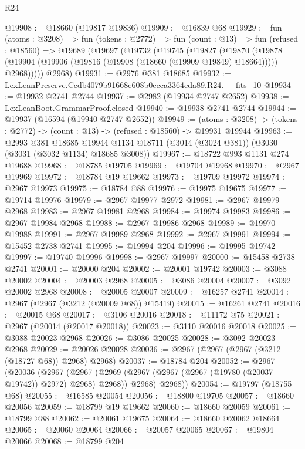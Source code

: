 \begin{lexlean}{R24}
\begin{coremodule}
@19908 := @18660 (@19817 @19836)
@19909 := @16839 @68
@19929 := fun (atoms : @3208) =>
  fun (tokens : @2772) =>
  fun (count : @13) =>
  fun (refused : @18560) =>
  @19689
    (@19697
      (@19732
        (@19745
          (@19827
            (@19870
              (@19878 (@19904 (@19906 (@19816 (@19908 (@18660 (@19909 @19849) @18664))))) @2968)))))
      @2968)
@19931 := @2976 @381 @18685
@19932 := LexLeanPreserve.Ccdb4079b91668e608b0ecca3364cda89.R24.__fits_10
@19934 := @19932 @2741 @2744
@19937 := @2982 (@19934 @2747 @2652)
@19938 := LexLeanBoot.GrammarProof.closed
@19940 := @19938 @2741 @2744
@19944 := @19937 (@16594 (@19940 @2747 @2652))
@19949 := (atoms : @3208) ->
  (tokens : @2772) -> (count : @13) -> (refused : @18560) -> @19931 @19944
@19963 := @2993
    @381
    @18685
    @19944
    @1134
    @18711
    (@3014 (@3024 @381))
    (@3030 (@3031 (@3032 @1134) @18685 @3008))
@19967 := @18722 @993 @1131 @274 @19688
@19968 := @18785 @19705
@19969 := @19704 @19968
@19970 := @2967 @19969
@19972 := @18784 @19 @19662
@19973 := @19709 @19972
@19974 := @2967 @19973
@19975 := @18784 @88
@19976 := @19975 @19675
@19977 := @19714 @19976
@19979 := @2967 @19977 @2972
@19981 := @2967 @19979 @2968
@19983 := @2967 @19981 @2968
@19984 := @19974 @19983
@19986 := @2967 @19984 @2968
@19988 := @2967 @19986 @2968
@19989 := @19970 @19988
@19991 := @2967 @19989 @2968
@19992 := @2967 @19991
@19994 := @15452 @2738 @2741
@19995 := @19994 @204
@19996 := @19995 @19742
@19997 := @19740 @19996
@19998 := @2967 @19997
@20000 := @15458 @2738 @2741
@20001 := @20000 @204
@20002 := @20001 @19742
@20003 := @3088 @20002
@20004 := @20003 @2968
@20005 := @3086 @20004
@20007 := @3092 @20002 @2968
@20008 := @20005 @20007
@20009 := @16257 @2741
@20014 := @2967 (@2967 (@3212 (@20009 @68)) @15419)
@20015 := @16261 @2741
@20016 := @20015 @68
@20017 := @3106 @20016
@20018 := @11172 @75
@20021 := @2967 (@20014 (@20017 @20018))
@20023 := @3110 @20016 @20018
@20025 := @3088 @20023 @2968
@20026 := @3086 @20025
@20028 := @3092 @20023 @2968
@20029 := @20026 @20028
@20036 := @2967 (@2967 (@2967 (@3212 (@18727 @68)) @2968) @2968)
@20037 := @18784 @204
@20052 := @2967
    (@20036
      (@2967
        (@2967 (@2969 (@2967 (@2967 (@2967 (@19780 (@20037 @19742)) @2972) @2968) @2968)) @2968)
        @2968))
@20054 := @19797 (@18755 @68)
@20055 := @16585 @20054
@20056 := @18800 @19705
@20057 := @18660 @20056
@20059 := @18799 @19 @19662
@20060 := @18660 @20059
@20061 := @18799 @88
@20062 := @20061 @19675
@20064 := @18660 @20062 @18664
@20065 := @20060 @20064
@20066 := @20057 @20065
@20067 := @19804 @20066
@20068 := @18799 @204

\end{coremodule}
\end{lexlean}
